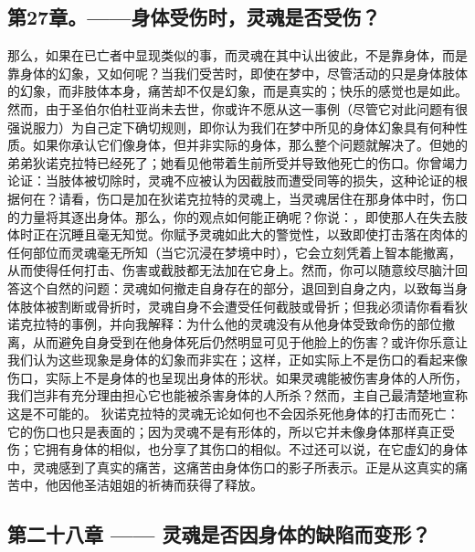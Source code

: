 
\subsection{第27章。——身体受伤时，灵魂是否受伤？}

那么，如果在已亡者中显现类似的事，而灵魂在其中认出彼此，不是靠身体，而是靠身体的幻象，又如何呢？当我们受苦时，即使在梦中，尽管活动的只是身体肢体的幻象，而非肢体本身，痛苦却不仅是幻象，而是真实的；快乐的感觉也是如此。然而，由于圣伯尔伯杜亚尚未去世，你或许不愿从这一事例（尽管它对此问题有很强说服力）为自己定下确切规则，即你认为我们在梦中所见的身体幻象具有何种性质。如果你承认它们像身体，但并非实际的身体，那么整个问题就解决了。但她的弟弟狄诺克拉特已经死了；她看见他带着生前所受并导致他死亡的伤口。你曾竭力论证：当肢体被切除时，灵魂不应被认为因截肢而遭受同等的损失，这种论证的根据何在？请看，伤口是加在狄诺克拉特的灵魂上，当灵魂居住在那身体中时，伤口的力量将其逐出身体。那么，你的观点如何能正确呢？你说：，即使那人在失去肢体时正在沉睡且毫无知觉。你赋予灵魂如此大的警觉性，以致即使打击落在肉体的任何部位而灵魂毫无所知（当它沉浸在梦境中时），它会立刻凭着上智本能撤离，从而使得任何打击、伤害或截肢都无法加在它身上。然而，你可以随意绞尽脑汁回答这个自然的问题：灵魂如何撤走自身存在的部分，退回到自身之内，以致每当身体肢体被割断或骨折时，灵魂自身不会遭受任何截肢或骨折；但我必须请你看看狄诺克拉特的事例，并向我解释：为什么他的灵魂没有从他身体受致命伤的部位撤离，从而避免自身受到在他身体死后仍然明显可见于他脸上的伤害？或许你乐意让我们认为这些现象是身体的幻象而非实在；这样，正如实际上不是伤口的看起来像伤口，实际上不是身体的也呈现出身体的形状。如果灵魂能被伤害身体的人所伤，我们岂非有充分理由担心它也能被杀害身体的人所杀？然而，主自己最清楚地宣称这是不可能的。 狄诺克拉特的灵魂无论如何也不会因杀死他身体的打击而死亡：它的伤口也只是表面的；因为灵魂不是有形体的，所以它并未像身体那样真正受伤；它拥有身体的相似，也分享了其伤口的相似。不过还可以说，在它虚幻的身体中，灵魂感到了真实的痛苦，这痛苦由身体伤口的影子所表示。正是从这真实的痛苦中，他因他圣洁姐姐的祈祷而获得了释放。\par


\subsection{第二十八章 —— 灵魂是否因身体的缺陷而变形？}

